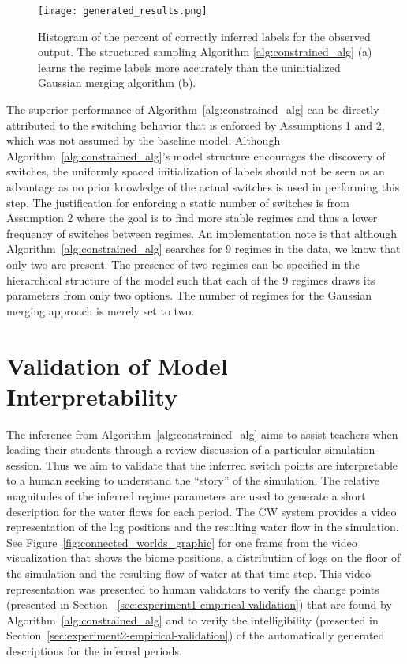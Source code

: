 \begin{figure}
\centering
\texttt{[image: generated\_results.png]}
\caption{Histogram of the percent of correctly inferred labels for the observed output. The structured sampling Algorithm \ref{alg:constrained_alg} (a) learns the regime labels more accurately than the uninitialized Gaussian merging algorithm (b).}
\label{fig:result_generated_histograms}
\end{figure}

The superior performance of Algorithm~\ref{alg:constrained_alg} can be directly attributed to the switching behavior that is enforced by Assumptions 1 and 2, which was not assumed by the baseline model. Although Algorithm~\ref{alg:constrained_alg}'s model structure encourages the discovery of switches, the uniformly spaced initialization of labels should not be seen as an advantage as no prior knowledge of the actual switches is used in performing this step. The justification for enforcing a static number of switches is from Assumption 2 where the goal is to find more stable regimes and thus a lower frequency of switches between regimes. An implementation note is that although Algorithm~\ref{alg:constrained_alg} searches for $9$ regimes in the data, we know that only two are present. The presence of two regimes can be specified in the hierarchical structure of the model such that each of the 9 regimes draws its parameters from only two options. The number of regimes for the Gaussian merging approach is merely set to two.

\section{Validation of Model Interpretability}

The inference from Algorithm~\ref{alg:constrained_alg} aims to assist teachers when leading their students through a review discussion of a particular simulation session. Thus we aim to validate that the inferred switch points are interpretable to a human seeking to understand the ``story'' of the simulation. The relative magnitudes of the inferred regime parameters are used to generate a short description for the water flows for each period. The CW system provides a video representation of the log positions and the resulting water flow in the simulation. See Figure~\ref{fig:connected_worlds_graphic} for one frame from the video visualization that shows the biome positions, a distribution of logs on the floor of the simulation and the resulting flow of water at that time step. This video representation was presented to human validators to verify the change points (presented in Section~ \ref{sec:experiment1-empirical-validation}) that are found by Algorithm~\ref{alg:constrained_alg} and to verify the intelligibility (presented in Section~\ref{sec:experiment2-empirical-validation}) of the automatically generated descriptions for the inferred periods.

